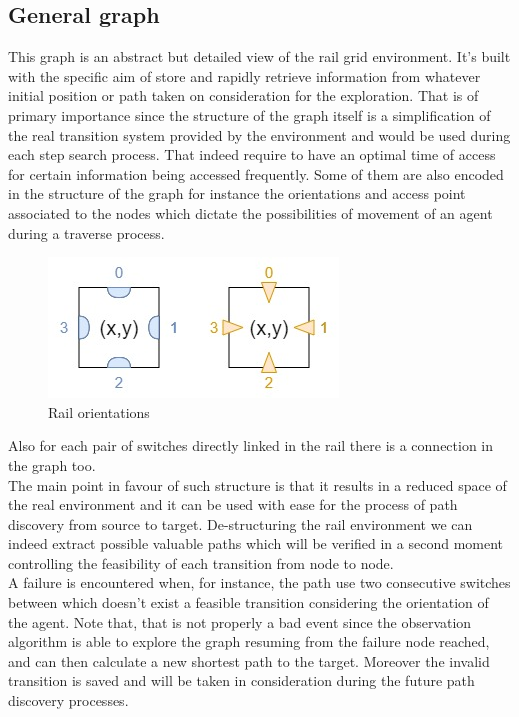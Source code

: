 \subsection{General graph}
This graph is an abstract but detailed view of the rail grid environment. It's built with the specific aim of store and rapidly retrieve information from whatever initial position or path taken on consideration for the exploration. That is of primary importance since the structure of the graph itself is a simplification of the real transition system provided by the environment and would be used during each step search process. That indeed require to have an optimal time of access for certain information being accessed frequently. Some of them are also encoded in the structure of the graph for instance the orientations and access point associated to the nodes which dictate the possibilities of movement of an agent during a traverse process.
\begin{figure}[H] 
\includegraphics[scale=0.8]{figures/orientations.jpg}
\centering
\caption{Rail orientations}
\end{figure}
Also for each pair of switches directly linked in the rail there is a connection in the graph too.\\
The main point in favour of such structure is that it results in a reduced space of the real environment and it can be used with ease for the process of path discovery from source to target. De-structuring the rail environment we can indeed extract possible valuable paths which will be verified in a second moment controlling the feasibility of each transition from node to node.\\
A failure is encountered when, for instance, the path use two consecutive switches between which doesn't exist a feasible transition considering the orientation of the agent. Note that, that is not properly a bad event since the observation algorithm is able to explore the graph resuming from the failure node reached, and can then calculate a new shortest path to the target. Moreover the invalid transition is saved and will be taken in consideration during the future path discovery processes. \\

